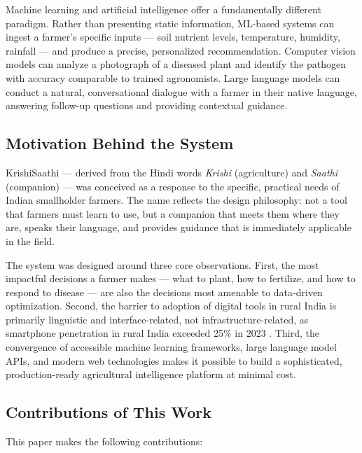 \documentclass[conference]{IEEEtran}
\begin{document}
Machine learning and artificial intelligence offer a fundamentally different paradigm. Rather than presenting static information, ML-based systems can ingest a farmer's specific inputs --- soil nutrient levels, temperature, humidity, rainfall --- and produce a precise, personalized recommendation. Computer vision models can analyze a photograph of a diseased plant and identify the pathogen with accuracy comparable to trained agronomists. Large language models can conduct a natural, conversational dialogue with a farmer in their native language, answering follow-up questions and providing contextual guidance.

\subsection{Motivation Behind the System}

KrishiSaathi --- derived from the Hindi words \textit{Krishi} (agriculture) and \textit{Saathi} (companion) --- was conceived as a response to the specific, practical needs of Indian smallholder farmers. The name reflects the design philosophy: not a tool that farmers must learn to use, but a companion that meets them where they are, speaks their language, and provides guidance that is immediately applicable in the field.

The system was designed around three core observations. First, the most impactful decisions a farmer makes --- what to plant, how to fertilize, and how to respond to disease --- are also the decisions most amenable to data-driven optimization. Second, the barrier to adoption of digital tools in rural India is primarily linguistic and interface-related, not infrastructure-related, as smartphone penetration in rural India exceeded 25\% in 2023 \cite{trai2023}. Third, the convergence of accessible machine learning frameworks, large language model APIs, and modern web technologies makes it possible to build a sophisticated, production-ready agricultural intelligence platform at minimal cost.

\subsection{Contributions of This Work}

This paper makes the following contributions:
\end{document}
